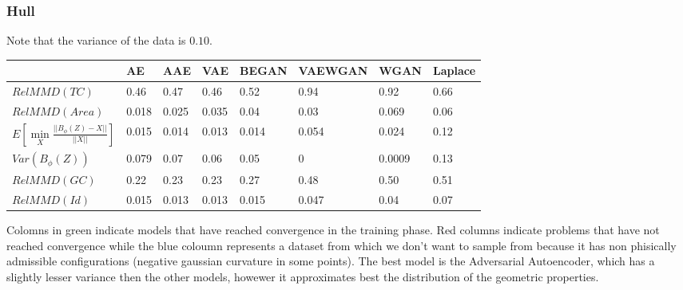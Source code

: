 \documentclass{article}
\begin{document}
\subsubsection{Hull}
Note that the variance of the data is $0.10$.
\begin{table}[H]
\begin{tabular}{|l|l|l|l|l|l|l|l|}
\hline
&  \cellcolor{green!30} AE & \cellcolor{green!30} AAE & \cellcolor{green!30} VAE & \cellcolor{green!30} BEGAN & \cellcolor{red!30} VAEWGAN & \cellcolor{red!30} WGAN &   \cellcolor{blue!30} Laplace \\ \hline
$RelMMD(TC)$ & \cellcolor{green!30} 0.46 & \cellcolor{green!30} 0.47  & \cellcolor{green!30} 0.46 & \cellcolor{green!30} 0.52 & \cellcolor{red!30} 0.94 & \cellcolor{red!30} 0.92 & \cellcolor{blue!30} 0.66\\ \hline
$RelMMD(Area)$  & \cellcolor{green!30} 0.018 & \cellcolor{green!30} 0.025 & \cellcolor{green!30} 0.035 & \cellcolor{green!30} 0.04 & \cellcolor{red!30} 0.03 &   \cellcolor{red!30} 0.069 & \cellcolor{blue!30} 0.06 \\ \hline
$E[\min\limits_{X} \frac{||B_{\phi}(Z)-X||}{||X||}]$& \cellcolor{green!30} 0.015 & \cellcolor{green!30} 0.014 & \cellcolor{green!30} 0.013 & \cellcolor{green!30} 0.014 & \cellcolor{red!30} 0.054& \cellcolor{red!30} 0.024 & \cellcolor{blue!30} 0.12 \\ \hline
$Var(B_{\phi}(Z))$& \cellcolor{green!30} 0.079 & \cellcolor{green!30} 0.07 & \cellcolor{green!30} 0.06 & \cellcolor{green!30} 0.05 &  \cellcolor{red!30} 0 & \cellcolor{red!30} 0.0009 & \cellcolor{blue!30 } 0.13\\ \hline
$RelMMD(GC)$ & \cellcolor{green!30} 0.22 & \cellcolor{green!30} 0.23 & \cellcolor{green!30} 0.23 & \cellcolor{green!30}  0.27 & \cellcolor{red!30} 0.48 & \cellcolor{red!30} 0.50& \cellcolor{blue!30} 0.51 \\ \hline
$RelMMD(Id)$ & \cellcolor{green!30} 0.015 & \cellcolor{green!30}  0.013 & \cellcolor{green!30} 0.013 & \cellcolor{green!30} 0.015 & \cellcolor{red!30} 0.047 & \cellcolor{red!30} 0.04& \cellcolor{blue!30} 0.07\\ \hline
\end{tabular}
\end{table}Colomns in green indicate models that have reached convergence in the training phase. Red columns indicate problems that have not reached convergence while the blue coloumn represents a dataset from which we don't want to sample from because it has non phisically admissible configurations (negative gaussian curvature in some points).
The best model is the Adversarial Autoencoder, which has a slightly lesser variance then the other models, howewer it approximates best the distribution of the geometric properties.
\begin{comment}
\subsubsection{Rabbit}
\end{comment}
\end{document}
